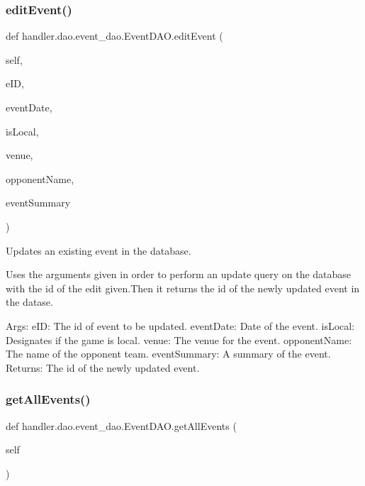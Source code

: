 \subsubsection{\texorpdfstring{edit\+Event()}{editEvent()}}
{\footnotesize\ttfamily def handler.\+dao.\+event\+\_\+dao.\+Event\+D\+A\+O.\+edit\+Event (\begin{DoxyParamCaption}\item[{}]{self,  }\item[{}]{e\+ID,  }\item[{}]{event\+Date,  }\item[{}]{is\+Local,  }\item[{}]{venue,  }\item[{}]{opponent\+Name,  }\item[{}]{event\+Summary }\end{DoxyParamCaption})}

\begin{DoxyVerb}Updates an existing event in the database.        

Uses the arguments given in order to perform an update query on 
the database with the id of the edit given.Then it returns
the id of the newly updated event in the datase.

Args:
    eID: The id of event to be updated.
    eventDate: Date of the event.
    isLocal: Designates if the game is local.
    venue: The venue for the event.            
    opponentName: The name of the opponent team.
    eventSummary: A summary of the event.            
Returns:
    The id of the newly updated event.
\end{DoxyVerb}
 \mbox{\label{classhandler_1_1dao_1_1event__dao_1_1_event_d_a_o_aea3ae629c4b67d1a36f88a8faa633b64}} 
\subsubsection{\texorpdfstring{get\+All\+Events()}{getAllEvents()}}
{\footnotesize\ttfamily def handler.\+dao.\+event\+\_\+dao.\+Event\+D\+A\+O.\+get\+All\+Events (\begin{DoxyParamCaption}\item[{}]{self }\end{DoxyParamCaption})}


